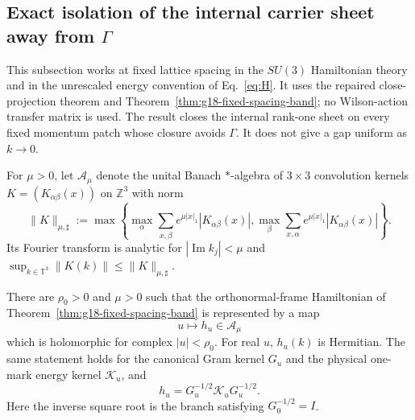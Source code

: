 %

\subsection{Exact isolation of the internal carrier sheet away from
\texorpdfstring{$\Gamma$}{Gamma}}
\label{sec:g18-internal-sheet-closure}

This subsection works at fixed lattice spacing in the $SU(3)$ Hamiltonian
theory and in the unrescaled energy convention of Eq.~\eqref{eq:H}.  It uses
the repaired close-projection theorem and
Theorem~\ref{thm:g18-fixed-spacing-band}; no Wilson-action transfer matrix is
used.  The result closes the internal rank-one sheet on every fixed momentum
patch whose closure avoids $\Gamma$.  It does not give a gap uniform as
$k\to0$.

For $\mu>0$, let $\mathcal A_\mu$ denote the unital Banach $*$-algebra of
$3\times3$ convolution kernels $K=(K_{\alpha\beta}(x))$ on $\mathbb Z^3$ with
norm
\begin{equation}
 \|K\|_{\mu,\sharp}:=
 \max\left\{
 \max_\alpha\sum_{x,\beta}e^{\mu|x|_1}|K_{\alpha\beta}(x)|,
 \max_\beta\sum_{x,\alpha}e^{\mu|x|_1}|K_{\alpha\beta}(x)|
 \right\}.
 \label{eq:g18-weighted-algebra}
\end{equation}
Its Fourier transform is analytic for
$|\operatorname{Im}k_j|<\mu$ and
$\sup_{k\in\mathbb T^3}\|K(k)\|\le\|K\|_{\mu,\sharp}$.

\begin{lemma}
\label{lem:g18-u-analytic-symbol}
There are $\rho_0>0$ and $\mu>0$ such that the orthonormal-frame Hamiltonian
of Theorem~\ref{thm:g18-fixed-spacing-band} is represented by a map
\begin{equation}
 u\longmapsto h_u\in\mathcal A_\mu
 \label{eq:g18-banach-holomorphic}
\end{equation}
which is holomorphic for complex $|u|<\rho_0$.  For real $u$, $h_u(k)$ is
Hermitian.  The same statement holds for the canonical Gram kernel $G_u$ and
the physical one-mark energy kernel $\mathcal K_u$, and
\begin{equation}
 h_u=G_u^{-1/2}\mathcal K_uG_u^{-1/2}.
 \label{eq:g18-h-from-gk}
\end{equation}
Here the inverse square root is the branch satisfying $G_0^{-1/2}=I$.
\end{lemma}


